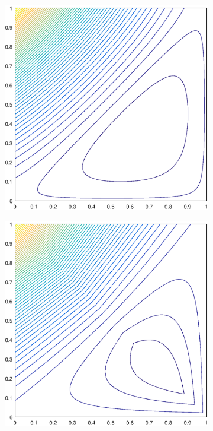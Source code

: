\documentclass[11pt]{article}
\begin{document}
\begin{figure}
\label{fig::2D_Quadratic_Summary_unit_square_basis_functions_b4}
\centering
	\begin{subfigure}[b]{0.25\textwidth}
		\centering
		\includegraphics[width=\textwidth]{figures/square_WACHSPRESS2_contour_b4.eps}
		\caption{}
	\end{subfigure}
	\hspace{1cm}
	\begin{subfigure}[b]{0.25\textwidth}
		\centering
		\includegraphics[width=\textwidth]{figures/square_PWLD2_contour_b4.eps}

\end{subfigure}
\end{figure}
\end{document}
